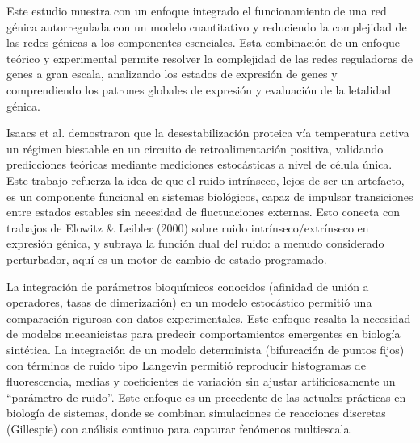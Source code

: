 \documentclass[nochap]{config/ejercicios}
\begin{document}
Este estudio muestra con un enfoque integrado el funcionamiento de una red génica autorregulada con un modelo cuantitativo y reduciendo la complejidad de las redes génicas a los componentes esenciales. Esta combinación de un enfoque teórico y experimental permite resolver la complejidad de las redes reguladoras de genes a gran escala, analizando los estados de expresión de genes y comprendiendo los patrones globales de expresión y evaluación de la letalidad génica.

Isaacs et al. demostraron que la desestabilización proteica vía temperatura activa un régimen biestable en un circuito de retroalimentación positiva, validando predicciones teóricas mediante mediciones estocásticas a nivel de célula única. Este trabajo refuerza la idea de que el ruido intrínseco, lejos de ser un artefacto, es un componente funcional en sistemas biológicos, capaz de impulsar transiciones entre estados estables  sin necesidad de fluctuaciones externas. Esto conecta con trabajos de Elowitz \& Leibler (2000) sobre ruido intrínseco/extrínseco en expresión génica, y subraya la función dual del ruido: a menudo considerado perturbador, aquí es un motor de cambio de estado programado.



La integración de parámetros bioquímicos conocidos (afinidad de unión a operadores, tasas de dimerización) en un modelo estocástico permitió una comparación rigurosa con datos experimentales. Este enfoque resalta la necesidad de modelos mecanicistas para predecir comportamientos emergentes en biología sintética.
La integración de un modelo determinista (bifurcación de puntos fijos) con términos de ruido tipo Langevin permitió reproducir histogramas de fluorescencia, medias y coeficientes de variación sin ajustar artificiosamente un “parámetro de ruido”. Este enfoque es un precedente de las actuales prácticas en biología de sistemas, donde se combinan simulaciones de reacciones discretas (Gillespie) con análisis continuo para capturar fenómenos multiescala.
\end{document}
